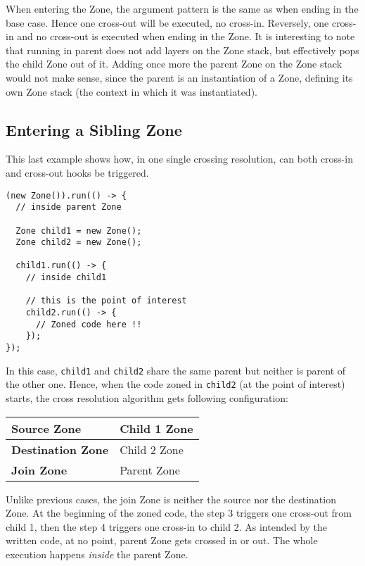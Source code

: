 When entering the Zone, the argument pattern is the same as when ending in the base case. Hence one cross-out will be executed, no cross-in. Reversely, one cross-in and no cross-out is executed when ending in the Zone.
It is interesting to note that running in parent does not add layers on the Zone stack, but effectively pops the child Zone out of it. Adding once more the parent Zone on the Zone stack would not make sense, since the parent is an instantiation of a Zone, defining its own Zone stack (the context in which it was instantiated).


\subsection*{Entering a Sibling Zone}

This last example shows how, in one single crossing resolution, can both cross-in and cross-out hooks be triggered.

\begin{lstlisting}
(new Zone()).run(() -> {
  // inside parent Zone

  Zone child1 = new Zone();
  Zone child2 = new Zone();

  child1.run(() -> {
    // inside child1
    
    // this is the point of interest
    child2.run(() -> {
      // Zoned code here !!
    });
});
\end{lstlisting}

In this case, \lstinline{child1} and \lstinline{child2} share the same parent but neither is parent of the other one. Hence, when the code zoned in \lstinline{child2} (at the point of interest) starts, the cross resolution algorithm gets following configuration:

\begin{tabular}{| l | l |}
\hline
\textbf{Source Zone} & Child 1 Zone
\\ \hline
\textbf{Destination Zone} & Child 2 Zone
\\ \hline
\textbf{Join Zone} & Parent Zone
\\ \hline
\end{tabular}

Unlike previous cases, the join Zone is neither the source nor the destination Zone. At the beginning of the zoned code, the step 3 triggers one cross-out from child 1, then the step 4 triggers one cross-in to child 2. As intended by the written code, at no point, parent Zone gets crossed in or out. The whole execution happens \emph{inside} the parent Zone.

